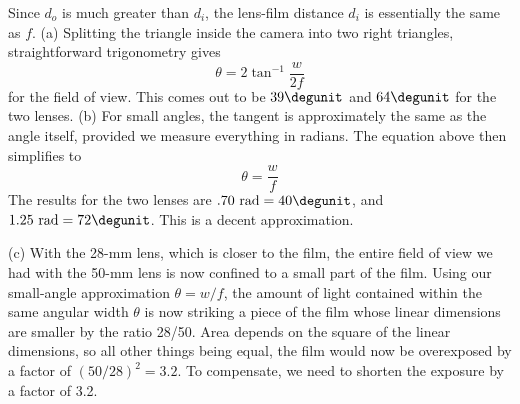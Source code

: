 Since $d_o$ is much greater than $d_i$, the lens-film
distance $d_i$ is essentially the same as $f$. (a) Splitting
the triangle inside the camera into two right triangles,
straightforward trigonometry gives
\begin{equation*}
		 \theta =  2 \tan^{-1}\frac{w}{2f}
\end{equation*}
 for the field of view. This comes out to be $39\degunit$ and
$64\degunit$ for the two lenses. (b) For small angles, the
tangent is approximately the same as the angle itself,
provided we measure everything in radians. The equation
above then simplifies to
\begin{equation*}
		 \theta  =  \frac{w}{f}
\end{equation*}
The results for the two lenses are $.70\ \text{rad}=40\degunit$, and
$1.25\ \text{rad}=72\degunit$. This is a decent approximation.

(c) With the 28-mm lens, which is closer to the film, the
entire field of view we had with the 50-mm lens is now
confined to a small part of the film. Using our small-angle
approximation $\theta =w/f$, the amount of light contained
within the same angular width $\theta $ is now striking a
piece of the film whose linear dimensions are smaller by the
ratio 28/50. Area depends on the square of the linear
dimensions, so all other things being equal, the film would
now be overexposed by a factor of $(50/28)^2=3.2$. To
compensate, we need to shorten the exposure by a factor of 3.2.



